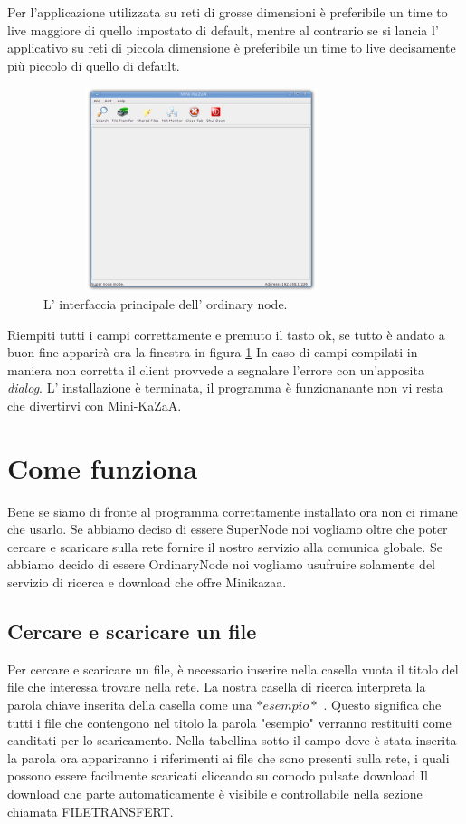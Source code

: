 Per l'applicazione utilizzata su reti di grosse dimensioni è preferibile un time to live maggiore di quello 
impostato di default, mentre al contrario se si lancia l' applicativo su reti di piccola dimensione è preferibile un time to live decisamente 
più piccolo di quello di default.
\begin{figure}[t]
 \centering
 \includegraphics[width=350px,height=225px]{images/mini_kazaa_client.eps}
 \caption{L' interfaccia principale dell' ordinary node.}
 \label{fig:mini}
\end{figure}
Riempiti tutti i campi correttamente e premuto il tasto ok, se tutto è andato a buon fine apparirà ora la finestra in figura 
\ref{fig:mini}
In caso di campi compilati in maniera non corretta il client provvede a segnalare l'errore con un'apposita \emph{dialog}.
L' installazione è terminata, il programma è funzionanante non vi resta che divertirvi con Mini-KaZaA.

\section{Come funziona}
Bene se siamo di fronte al programma correttamente installato ora non ci rimane che usarlo.
Se abbiamo deciso di essere SuperNode noi vogliamo oltre che poter cercare e scaricare sulla rete fornire il nostro servizio alla comunica globale.
Se abbiamo decido di essere OrdinaryNode noi vogliamo usufruire solamente del servizio di ricerca e download che offre Minikazaa.
	\subsection{Cercare e scaricare un file}
Per cercare e scaricare un file, è necessario inserire nella casella vuota il titolo del file che interessa trovare nella rete.
La nostra casella di ricerca interpreta la parola chiave inserita della casella come una $ *esempio* $ . Questo significa che tutti i file che contengono nel titolo la parola "esempio" verranno restituiti come canditati per lo scaricamento.
Nella tabellina sotto il campo dove è stata inserita la parola ora appariranno i riferimenti ai file che sono presenti sulla rete, i quali possono essere facilmente scaricati cliccando su comodo pulsate download
Il download che parte automaticamente è visibile e controllabile nella sezione chiamata FILETRANSFERT.

